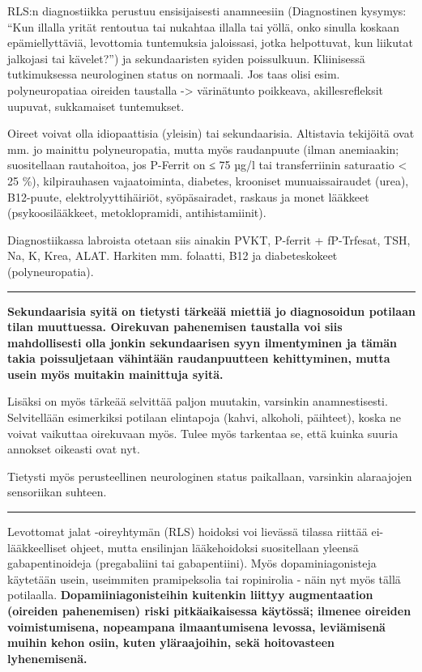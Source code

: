 \documentclass[
]{book}
\begin{document}
RLS:n diagnostiikka perustuu ensisijaisesti anamneesiin (Diagnostinen kysymys: ``Kun illalla yrität rentoutua tai nukahtaa illalla tai yöllä, onko sinulla koskaan epämiellyttäviä, levottomia tuntemuksia jaloissasi, jotka helpottuvat, kun liikutat jalkojasi tai kävelet?'') ja sekundaaristen syiden poissulkuun. Kliinisessä tutkimuksessa neurologinen status on normaali. Jos taas olisi esim. polyneuropatiaa oireiden taustalla -\textgreater{} värinätunto poikkeava, akillesrefleksit uupuvat, sukkamaiset tuntemukset.

Oireet voivat olla idiopaattisia (yleisin) tai sekundaarisia. Altistavia tekijöitä ovat mm. jo mainittu polyneuropatia, mutta myös raudanpuute (ilman anemiaakin; suositellaan rautahoitoa, jos P-Ferrit on ≤ 75 µg/l tai transferriinin saturaatio \textless{} 25 \%), kilpirauhasen vajaatoiminta, diabetes, krooniset munuaissairaudet (urea), B12-puute, elektrolyyttihäiriöt, syöpäsairadet, raskaus ja monet lääkkeet (psykoosilääkkeet, metoklopramidi, antihistamiinit).

Diagnostiikassa labroista otetaan siis ainakin PVKT, P-ferrit + fP-Trfesat, TSH, Na, K, Krea, ALAT. Harkiten mm. folaatti, B12 ja diabeteskokeet (polyneuropatia).

\begin{center}\rule{0.5\linewidth}{0.5pt}\end{center}

\textbf{Sekundaarisia syitä on tietysti tärkeää miettiä jo diagnosoidun potilaan tilan muuttuessa. Oirekuvan pahenemisen taustalla voi siis mahdollisesti olla jonkin sekundaarisen syyn ilmentyminen ja tämän takia poissuljetaan vähintään raudanpuutteen kehittyminen, mutta usein myös muitakin mainittuja syitä.}

Lisäksi on myös tärkeää selvittää paljon muutakin, varsinkin anamnestisesti. Selvitellään esimerkiksi potilaan elintapoja (kahvi, alkoholi, päihteet), koska ne voivat vaikuttaa oirekuvaan myös. Tulee myös tarkentaa se, että kuinka suuria annokset oikeasti ovat nyt.

Tietysti myös perusteellinen neurologinen status paikallaan, varsinkin alaraajojen sensoriikan suhteen.

\begin{center}\rule{0.5\linewidth}{0.5pt}\end{center}

Levottomat jalat -oireyhtymän (RLS) hoidoksi voi lievässä tilassa riittää ei-lääkkeelliset ohjeet, mutta ensilinjan lääkehoidoksi suositellaan yleensä gabapentinoideja (pregabaliini tai gabapentiini). Myös dopaminiagonisteja käytetään usein, useimmiten pramipeksolia tai ropinirolia - näin nyt myös tällä potilaalla. \textbf{Dopamiiniagonisteihin kuitenkin liittyy augmentaation (oireiden pahenemisen) riski pitkäaikaisessa käytössä; ilmenee oireiden voimistumisena, nopeampana ilmaantumisena levossa, leviämisenä muihin kehon osiin, kuten yläraajoihin, sekä hoitovasteen lyhenemisenä.}
\end{document}
